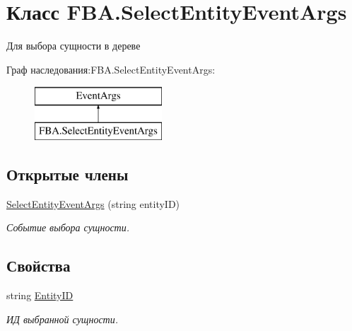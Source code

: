 \hypertarget{class_f_b_a_1_1_select_entity_event_args}{}\section{Класс F\+B\+A.\+Select\+Entity\+Event\+Args}
\label{class_f_b_a_1_1_select_entity_event_args}


Для выбора сущности в дереве  


Граф наследования\+:F\+B\+A.\+Select\+Entity\+Event\+Args\+:\begin{figure}[H]
\begin{center}
\leavevmode
\includegraphics[height=2.000000cm]{class_f_b_a_1_1_select_entity_event_args}
\end{center}
\end{figure}
\subsection*{Открытые члены}
\begin{DoxyCompactItemize}
\item 
\mbox{\hyperlink{class_f_b_a_1_1_select_entity_event_args_a2c819b968bf4e5f6cd8c6c99248cb314}{Select\+Entity\+Event\+Args}} (string entity\+ID)
\begin{DoxyCompactList}\small\item\em Событие выбора сущности. \end{DoxyCompactList}\end{DoxyCompactItemize}
\subsection*{Свойства}
\begin{DoxyCompactItemize}
\item 
string \mbox{\hyperlink{class_f_b_a_1_1_select_entity_event_args_a2fb5859b5100de7fcf8cc4a6061c0596}{Entity\+ID}}
\begin{DoxyCompactList}\small\item\em ИД выбранной сущности. \end{DoxyCompactList}\end{DoxyCompactItemize}


